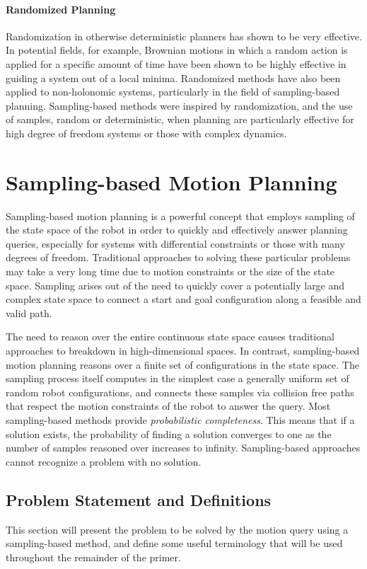 \paragraph {Randomized Planning}
Randomization in otherwise deterministic planners has shown to be very
effective.  In potential fields, for example, Brownian motions in which a random
action is applied for a specific amount of time have been shown to be highly
effective in guiding a system out of a local minima.  Randomized methods have 
also been applied to non-holonomic systems, particularly in the field of 
sampling-based planning.  Sampling-based methods were inspired by randomization,
and the use of samples, random or deterministic, when planning are particularly
effective for high degree of freedom systems or those with complex dynamics.

\section {Sampling-based Motion Planning}
\label {sect:samplingbasedplanning}
Sampling-based motion planning is a powerful concept that employs sampling of 
the state space of the robot in order to quickly and effectively answer planning 
queries, especially for systems with differential constraints or those with 
many degrees of freedom.  Traditional approaches to solving these particular 
problems may take a very long time due to motion constraints or the size of the 
state space.  Sampling arises out of the need to quickly cover a potentially 
large and complex state space to connect a start and goal configuration along a 
feasible and valid path.

The need to reason over the entire continuous state space causes traditional
approaches to breakdown in high-dimensional spaces.  In contrast, sampling-based
motion planning reasons over a finite set of configurations in the state space.
The sampling process itself computes in the simplest case a generally uniform 
set of random robot configurations, and connects these samples via collision 
free paths that respect the motion constraints of the robot to answer the query.
Most sampling-based methods provide {\it probabilistic completeness}.  This 
means that if a solution exists, the probability of finding a solution converges
to one as the number of samples reasoned over increases to infinity.  
Sampling-based approaches cannot recognize a problem with no solution.

\subsection {Problem Statement and Definitions}
This section will present the problem to be solved by the motion query using
a sampling-based method, and define some useful terminology that will be used
throughout the remainder of the primer.

